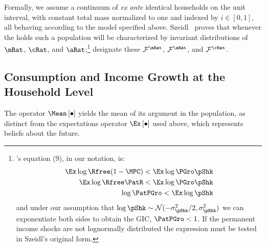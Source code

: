 \documentclass[BufferStockTheory]{subfiles}
\begin{document}
Formally, we assume a continuum of \textit{ex ante} identical households on the unit interval, with constant total mass normalized to one and indexed by $i \in [0,1]$, all behaving according to the model specified above.  Szeidl~\citeyearpar{szeidlInvariant} proves that whenever the {\GIC} holds such a population will be characterized by invariant distributions of $\mRat$, $\cRat$, and $\aRat$;\footnote{\cite{szeidlInvariant}'s equation (9), in our notation, is:
  \begin{align*}
    \Ex \log \Rfree (1-\MPC) < \Ex \log \PGro \pShk
    \\  \Ex \log \Rfree \PatR    < \Ex \log \PGro \pShk
\\ \log \PatPGro < \Ex \log \pShk
  \end{align*}
  and under our assumption that $\log \pShk \sim \mathcal{N}(-\sigma^{2}_{\pShk}/2,\sigma^{2}_{\pShk})$ we can exponentiate both sides to obtain the GIC, $\PatPGro < 1$.  If the permanent income shocks are not lognormally distributed the expression must be tested in Szeidl's original form.
} designate these $\mathcal{F}^{\mRat}$, $\mathcal{F}^{\aRat}$, and $\mathcal{F}^{\cRat}$.%


\hypertarget{Consumption-and-Income-Growth-at-the-Household-Level}{}
\subsection{Consumption and Income Growth at the Household Level}\label{subsec:cGroEqPGroIndQ}

The operator $\Mean\left[\bullet\right]$ yields the mean of its argument in the population, as distinct from the expectations operator $\Ex\left[\bullet\right]$ used above, which represents beliefs about the future.
\end{document}
